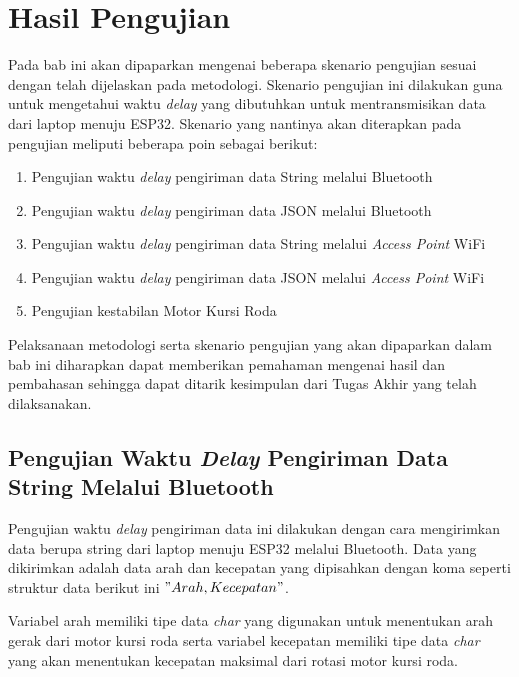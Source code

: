 \section{Hasil Pengujian}
\label{sec:hasil pengujian}

Pada bab ini akan dipaparkan mengenai beberapa skenario pengujian sesuai dengan telah dijelaskan pada metodologi. Skenario pengujian ini dilakukan guna untuk mengetahui waktu \emph{delay} yang dibutuhkan untuk mentransmisikan data dari laptop menuju ESP32. Skenario yang nantinya akan diterapkan pada pengujian meliputi beberapa poin sebagai berikut:

\begin{enumerate}
  \item Pengujian waktu \emph{delay} pengiriman data String melalui Bluetooth
  \item Pengujian waktu \emph{delay} pengiriman data JSON melalui Bluetooth
  \item Pengujian waktu \emph{delay} pengiriman data String melalui \emph{Access Point} WiFi
  \item Pengujian waktu \emph{delay} pengiriman data JSON melalui \emph{Access Point} WiFi
  \item Pengujian kestabilan Motor Kursi Roda
\end{enumerate}

Pelaksanaan metodologi serta skenario pengujian yang akan dipaparkan dalam bab ini diharapkan dapat memberikan pemahaman mengenai hasil dan pembahasan sehingga dapat ditarik kesimpulan dari Tugas Akhir yang telah dilaksanakan.

\subsection{Pengujian Waktu \emph{Delay} Pengiriman Data String Melalui Bluetooth}
\label{sec:delayBluetooth}

Pengujian waktu \emph{delay} pengiriman data ini dilakukan dengan cara mengirimkan data berupa string dari laptop menuju ESP32 melalui Bluetooth. Data yang dikirimkan adalah data arah dan kecepatan yang dipisahkan dengan koma seperti struktur data berikut ini \("Arah,Kecepatan"\).



Variabel arah memiliki tipe data \emph{char} yang digunakan untuk menentukan arah gerak dari motor kursi roda serta variabel kecepatan memiliki tipe data \emph{char} yang akan menentukan kecepatan maksimal dari rotasi motor kursi roda. %

